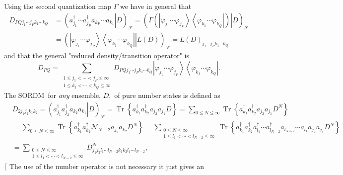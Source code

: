 \documentclass[aps,preprint]{revtex4}%
\begin{document}
Using the second quantization map $\Gamma$ we have in general that
\begin{align}
D_{PQj_{1}\cdots j_{P}k_{1}\cdots k_{Q}}  &  =\left(  \left.  a_{j_{1}%
}^{\dagger}\cdots a_{j_{P}}^{\dagger}a_{k_{P}}\cdots a_{k_{1}}\right\vert
D\right)  _{\mathcal{F}}=\left(  \left.  \Gamma\left(  \left\vert
\varphi_{j_{1}}\cdots\varphi_{j_{P}}\right\rangle \left\langle \varphi_{k_{1}%
}\cdots\varphi_{k_{Q}}\right\vert \right)  \right\vert D\right)
_{\mathcal{F}}\nonumber\\
&  =\left(  \left.  \left\vert \varphi_{j_{1}}\cdots\varphi_{j_{P}%
}\right\rangle \left\langle \varphi_{k_{1}}\cdots\varphi_{k_{Q}}\right\vert
\right\vert L\left(  D\right)  \right)  _{\mathcal{F}}=L\left(  D\right)
_{j_{1}\cdots j_{P}k_{1}\cdots k_{Q}}%
\end{align}
and that the general "reduced density/transition operator" is
\begin{equation}
D_{PQ}=\sum_{\substack{1\leq j_{1}<\cdots<j_{P}\leq\infty\\1\leq k_{1}%
<\cdots<k_{Q}\leq\infty}}D_{PQj_{1}\cdots j_{P}k_{1}\cdots k_{Q}}\left\vert
\varphi_{j_{1}}\cdots\varphi_{j_{P}}\right\rangle \left\langle \varphi_{k_{1}%
}\cdots\varphi_{k_{Q}}\right\vert .
\end{equation}
The SORDM\ for \emph{any }ensemble, $D,$ of pure number states is defined as
\begin{align}
&  D_{2j_{1}j_{2}k_{1}k_{2}}=\left(  \left.  a_{j_{1}}^{\dagger}a_{j_{2}%
}^{\dagger}a_{k_{2}}a_{k_{1}}\right\vert D\right)  _{\mathcal{F}%
}=\operatorname{Tr}\left\{  a_{k_{1}}^{\dagger}a_{k_{2}}^{\dagger}a_{j_{2}%
}a_{j_{1}}D\right\}  =\sum_{0\leq N\leq\infty}\operatorname{Tr}\left\{
a_{k_{1}}^{\dagger}a_{k_{2}}^{\dagger}a_{j_{2}}a_{j_{1}}D^{N}\right\}
\nonumber\\
&  =\sum_{0\leq N\leq\infty}\operatorname{Tr}\left\{  a_{k_{1}}^{\dagger
}a_{k_{2}}^{\dagger}\mathcal{N}_{N-2}a_{j_{2}}a_{k_{2}}D^{N}\right\}
=\sum_{\substack{0\leq N\leq\infty\\1\leq l_{1}<\cdots<l_{N-2}\leq\infty
}}\operatorname{Tr}\left\{  a_{k_{1}}^{\dagger}a_{k_{2}}^{\dagger}a_{l_{1}%
}^{\dagger}\cdots a_{l_{N-2}}^{\dagger}a_{l_{N-2}}\cdots a_{l_{1}}a_{j_{2}%
}a_{j_{1}}D^{N}\right\} \nonumber\\
&  =\sum_{\substack{0\leq N\leq\infty\\1\leq l_{1}<\cdots<l_{N-2}\leq\infty
}}D_{j_{1}j_{2}l_{1}\cdots l_{N-2}k_{1}k_{2}l_{1}\cdots l_{N-2}}^{N},
\end{align}
$\lceil$ The use of the number operator is not necessary it just gives an
\end{document}
